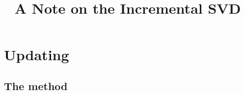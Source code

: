 \documentclass[11pt,a4paper]{article}
\theoremstyle{break}
\numberwithin{dummy}{section}
\theoremstyle{plain}
\theoremstyle{plain}
\theoremstyle{plain}
\theoremstyle{plain}
\theoremstyle{plain}
\theoremstyle{MyNonumberplain}
\newcommand{\0}{\M{0}}
\newenvironment{changemargin}[2]{%
  \begin{list}{}{%
      \setlength{\topsep}{0pt}%
      \setlength{\leftmargin}{#1}%
      \setlength{\rightmargin}{#2}%
      \setlength{\listparindent}{\parindent}%
      \setlength{\itemindent}{\parindent}%
      \setlength{\parsep}{\parskip}%
    }%
  \item[]}
  {\end{list}}
\newenvironment{keywords}{%
  \begingroup
  \def\and{\unskip\space\textperiodcentered\space\ignorespaces}
  \begin{changemargin}{\leftmargin}{\leftmargin}
    \small\noindent\emph{Keywords}:}
  {\end{changemargin}
  \endgroup
}
\begin{document}
\title{A Note on the Incremental SVD}

\date{}

\author{}


\maketitle





\section{Updating}

\subsection{The method}
\end{document}
